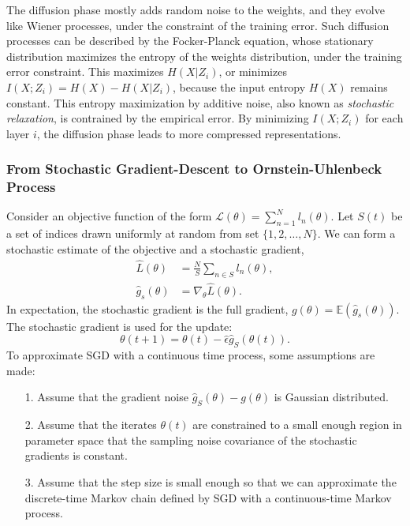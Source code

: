 \documentclass[11pt]{article}
\begin{document}
The diffusion phase mostly adds random noise to the weights, and they evolve like Wiener processes, under the constraint of the training error. Such diffusion processes can be described by the Focker-Planck equation, whose stationary distribution maximizes the entropy of the weights distribution, under the training error constraint. This maximizes $H(X\vert Z_i)$, or minimizes $I(X;Z_i) = H(X) - H(X\vert Z_i)$, because the input entropy $H(X)$ remains constant. This entropy maximization by additive noise, also known as \emph{stochastic relaxation}, is contrained by the empirical error. By minimizing $I(X;Z_i)$ for each layer $i$, the diffusion phase leads to more compressed representations.

\subsubsection*{From Stochastic Gradient-Descent to Ornstein-Uhlenbeck Process}

Consider an objective function of the form $\mathcal L(\theta) = \sum_{n=1}^N l_n(\theta)$. Let $S(t)$ be a set of indices drawn uniformly at random from set $\{1,2,\dots,N\}$. We can form a stochastic estimate of the objective and a stochastic gradient,
\begin{align}
\hat L(\theta) &= \frac{N}{S} \sum_{n\in S} l_n(\theta),\\
\hat g_s(\theta) &= \nabla_\theta  \hat L(\theta).
\end{align}
In expectation, the stochastic gradient is the full gradient, $g(\theta) = \mathbb E(\hat{g}_s(\theta) )$. The stochastic gradient is used for the update:
\begin{equation}
\theta(t+1) = \theta(t) - \hat\epsilon \hat g_S(\theta(t)).
\end{equation}
To approximate SGD with a continuous time process, some assumptions are made:
\begin{itemize}
\item[1.] Assume that the gradient noise $\hat g_S(\theta)-g(\theta) $ is Gaussian distributed.
\item[2.] Assume that the iterates $\theta(t)$ are constrained to a small enough region in parameter space that the sampling noise covariance of the stochastic gradients is constant.
\item[3.] Assume that the step size is small enough so that we can approximate the discrete-time Markov chain defined by SGD with a continuous-time Markov process.
\end{itemize}
\end{document}
